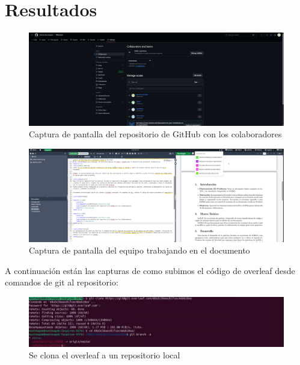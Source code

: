 \documentclass[letterpaper,12pt]{article}
\begin{document}
\section{Resultados}

\begin{figure}[H]
    \centering
    \includegraphics[width=14cm]{Imagenes/Colaboradores.png}
    \caption{Captura de pantalla del repositorio de GitHub con los colaboradores}
    \label{fig:colaboradores}
\end{figure}


\begin{figure}[H]
    \centering
    \includegraphics[width=14cm]{Imagenes/Edicion.png}
    \caption{Captura de pantalla del equipo trabajando en el documento}
    \label{fig:colaboradores}
\end{figure}

A continuación están las capturas de como subimos el código de overleaf desde comandos de git al repositorio:

\begin{figure}[H]
    \centering
    \includegraphics[width=14cm]{Imagenes/clon.jpeg}
    \caption{Se clona el overleaf a un repositorio local}
    \label{fig:colaboradores}
\end{figure}
\end{document}

